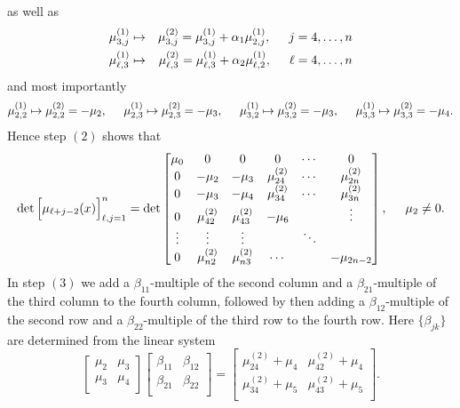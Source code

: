 \documentclass[10pt,oneside,reqno]{amsart}
\numberwithin{equation}{section}
\begin{document}
as well as
\begin{eqnarray*}
  \mu^{(1)}_{3,j}&\mapsto& \mu^{(2)}_{3,j} = \mu^{(1)}_{3,j}+\alpha_1\mu^{(1)}_{2,j},\hspace{0.5cm}j=4,\ldots,n\\
  \mu^{(1)}_{\ell,3}&\mapsto& \mu^{(2)}_{\ell,3} = \mu^{(1)}_{\ell,3}+\alpha_2\mu^{(1)}_{\ell,2},\hspace{0.5cm}\ell=4,\ldots,n
\end{eqnarray*}
and most importantly
\begin{equation}
  \mu^{(1)}_{2,2}\mapsto \mu^{(2)}_{2,2} = -\mu_2,\hspace{0.5cm} \mu^{(1)}_{2,3}\mapsto \mu^{(2)}_{2,3}=-\mu_3,\hspace{0.5cm}
  \mu^{(1)}_{3,2}\mapsto\mu^{(2)}_{3,2}=-\mu_3,\hspace{0.5cm}\mu^{(1)}_{3,3}\mapsto\mu^{(2)}_{3,3}=-\mu_4.
\end{equation}
Hence step $(2)$ shows that
\begin{equation*}
  \det\Big[\mu_{\ell+j-2}(x)\Big]_{\ell,j=1}^{n} = \det\begin{bmatrix}
                                                        \mu_0 & 0 & 0 & 0 &\cdots & 0\\
0 & -\mu_2 & -\mu_3 & \mu_{24}^{(2)} & \cdots & \mu_{2n}^{(2)}\\
0 & -\mu_3 & -\mu_4 & \mu_{34}^{(2)} & \cdots & \mu_{3n}^{(2)}\\
0 & \mu_{42}^{(2)} & \mu_{43}^{(2)} & -\mu_6 & & \vdots\\
\vdots& \vdots & \vdots & &\ddots & \\
0 & \mu_{n2}^{(2)} & \mu_{n3}^{(2)} & \cdots & & -\mu_{2n-2}\\
                                                       \end{bmatrix},\hspace{0.5cm}\mu_2\neq 0.
\end{equation*}
In step $(3)$ we add a $\beta_{11}$-multiple of the second column and a $\beta_{21}$-multiple of the third column to the fourth column, followed by
then adding a $\beta_{12}$-multiple of the second row and a $\beta_{22}$-multiple of the third row to the fourth row. Here $\{\beta_{jk}\}$ are 
determined from the linear system
\begin{equation*}
  \begin{bmatrix}
   \mu_2 & \mu_3\\
  \mu_3 & \mu_4 \\
  \end{bmatrix}\begin{bmatrix}
  \beta_{11}& \beta_{12}\\
  \beta_{21}& \beta_{22}\\
\end{bmatrix} = \begin{bmatrix}
  \mu_{24}^{(2)} +\mu_4 &\mu_{42}^{(2)}+\mu_4\\
  \mu_{34}^{(2)} +\mu_5 & \mu_{43}^{(2)}+\mu_5\\
\end{bmatrix}.
\end{equation*}
\end{document}
